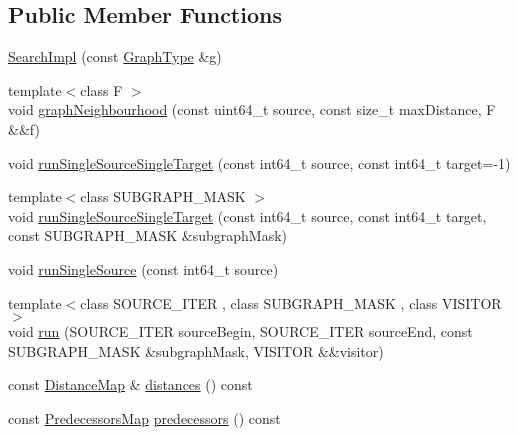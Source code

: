 \subsection*{Public Member Functions}
\begin{DoxyCompactItemize}
\item 
\hyperlink{classnifty_1_1graph_1_1detail__graph_1_1SearchImpl_ace982d78d456d1eda46bbdeb6c4ff3b9}{Search\+Impl} (const \hyperlink{classnifty_1_1graph_1_1detail__graph_1_1SearchImpl_a62a34d3de4ba4e0bc6b81eb4bf32bd9b}{Graph\+Type} \&g)
\item 
{\footnotesize template$<$class F $>$ }\\void \hyperlink{classnifty_1_1graph_1_1detail__graph_1_1SearchImpl_a9c1d6dd401e9557df0f3a3a186ce13c1}{graph\+Neighbourhood} (const uint64\+\_\+t source, const size\+\_\+t max\+Distance, F \&\&f)
\item 
void \hyperlink{classnifty_1_1graph_1_1detail__graph_1_1SearchImpl_ae8e3bf7786467e899abb8c4507fc77fe}{run\+Single\+Source\+Single\+Target} (const int64\+\_\+t source, const int64\+\_\+t target=-\/1)
\item 
{\footnotesize template$<$class S\+U\+B\+G\+R\+A\+P\+H\+\_\+\+M\+A\+SK $>$ }\\void \hyperlink{classnifty_1_1graph_1_1detail__graph_1_1SearchImpl_ab662caa4f11668c78c516554dc6a97a1}{run\+Single\+Source\+Single\+Target} (const int64\+\_\+t source, const int64\+\_\+t target, const S\+U\+B\+G\+R\+A\+P\+H\+\_\+\+M\+A\+SK \&subgraph\+Mask)
\item 
void \hyperlink{classnifty_1_1graph_1_1detail__graph_1_1SearchImpl_af5ed3bebeeea7d64e9d4118732514fb5}{run\+Single\+Source} (const int64\+\_\+t source)
\item 
{\footnotesize template$<$class S\+O\+U\+R\+C\+E\+\_\+\+I\+T\+ER , class S\+U\+B\+G\+R\+A\+P\+H\+\_\+\+M\+A\+SK , class V\+I\+S\+I\+T\+OR $>$ }\\void \hyperlink{classnifty_1_1graph_1_1detail__graph_1_1SearchImpl_a8210b1709b1222c575b5c3e0a591be1f}{run} (S\+O\+U\+R\+C\+E\+\_\+\+I\+T\+ER source\+Begin, S\+O\+U\+R\+C\+E\+\_\+\+I\+T\+ER source\+End, const S\+U\+B\+G\+R\+A\+P\+H\+\_\+\+M\+A\+SK \&subgraph\+Mask, V\+I\+S\+I\+T\+OR \&\&visitor)
\item 
const \hyperlink{classnifty_1_1graph_1_1detail__graph_1_1SearchImpl_a9f3e049a2ddbf34d81d9db4b7dd2839f}{Distance\+Map} \& \hyperlink{classnifty_1_1graph_1_1detail__graph_1_1SearchImpl_a12e6e88a24e3a0224efa401050bde969}{distances} () const
\item 
const \hyperlink{classnifty_1_1graph_1_1detail__graph_1_1SearchImpl_a23e9569c5680c5fd50f5f16235ef8016}{Predecessors\+Map} \hyperlink{classnifty_1_1graph_1_1detail__graph_1_1SearchImpl_a750b41bd017661bedf213954e7e5c3cb}{predecessors} () const
\end{DoxyCompactItemize}



